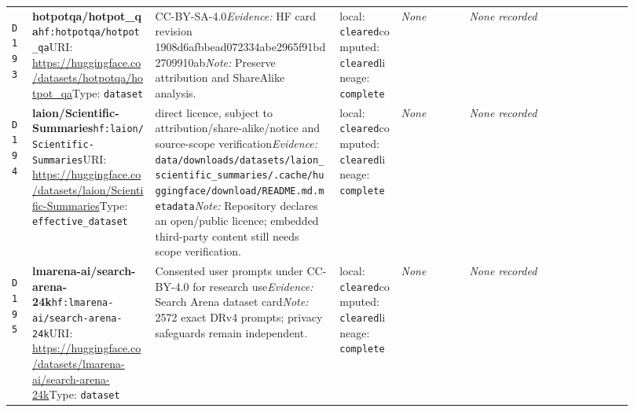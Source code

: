 \documentclass[9pt,a4paper]{article}
\newcommand{\depid}[1]{\hypertarget{dep:#1}{\texttt{#1}}}
\begin{document}
\begin{landscape}
\begin{longtable}{@{}L{0.035\linewidth}L{0.185\linewidth}L{0.27\linewidth}L{0.09\linewidth}L{0.10\linewidth}L{0.24\linewidth}@{}}
\depid{D193} & \textbf{hotpotqa/hotpot\_qa}\newline \nolinkurl{hf:hotpotqa/hotpot_qa}\newline URI: \url{https://huggingface.co/datasets/hotpotqa/hotpot_qa}\newline Type: \texttt{dataset} & CC-BY-SA-4.0\newline \textit{Evidence:} HF card revision 1908d6afbbead072334abe2965f91bd2709910ab\newline \textit{Note:} Preserve attribution and ShareAlike analysis. & local: \texttt{cleared}\newline computed: \texttt{cleared}\newline lineage: \texttt{complete} & \textit{None} & \textit{None recorded} \\
\depid{D194} & \textbf{laion/Scientific-Summaries}\newline \nolinkurl{hf:laion/Scientific-Summaries}\newline URI: \url{https://huggingface.co/datasets/laion/Scientific-Summaries}\newline Type: \texttt{effective\_dataset} & direct licence, subject to attribution/share-alike/notice and source-scope verification\newline \textit{Evidence:} \nolinkurl{data/downloads/datasets/laion_scientific_summaries/.cache/huggingface/download/README.md.metadata}\newline \textit{Note:} Repository declares an open/public licence; embedded third-party content still needs scope verification. & local: \texttt{cleared}\newline computed: \texttt{cleared}\newline lineage: \texttt{complete} & \textit{None} & \textit{None recorded} \\
\depid{D195} & \textbf{lmarena-ai/search-arena-24k}\newline \nolinkurl{hf:lmarena-ai/search-arena-24k}\newline URI: \url{https://huggingface.co/datasets/lmarena-ai/search-arena-24k}\newline Type: \texttt{dataset} & Consented user prompts under CC-BY-4.0 for research use\newline \textit{Evidence:} Search Arena dataset card\newline \textit{Note:} 2572 exact DRv4 prompts; privacy safeguards remain independent. & local: \texttt{cleared}\newline computed: \texttt{cleared}\newline lineage: \texttt{complete} & \textit{None} & \textit{None recorded} \\

\end{longtable}
\end{landscape}
\end{document}
